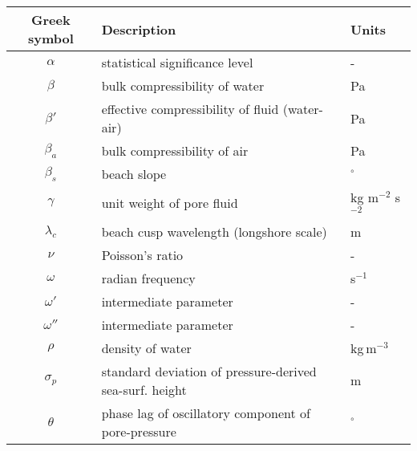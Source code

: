 \setlongtables
\begin{longtable}{cll}
	\hline
	Greek symbol & Description & Units\\
	\hline
	\endhead
	\hline
	\endfoot
	
	$\alpha$ & statistical significance level & -\\	
	$\beta$ & bulk compressibility of water & Pa\\
	$\beta'$ & effective compressibility of fluid (water-air) & Pa\\
	$\beta_a$ & bulk compressibility of air & Pa\\
	$\beta_s$ & beach slope & $^\circ$\\
	$\gamma$ & unit weight of pore fluid & kg m$^{-2}$ s$^{-2}$\\
	$\lambda_c$ & beach cusp wavelength (longshore scale) & m\\
	$\nu$ & Poisson's ratio & -\\
	$\omega$ & radian frequency & s$^{-1}$\\
	$\omega'$ & \citet{Yamamoto_etal1978} intermediate parameter & -\\
	$\omega''$ & \citet{Yamamoto_etal1978} intermediate parameter & -\\
	$\rho$ & density of water & kg\,m$^{-3}$\\
	$\sigma_p$ & standard deviation of pressure-derived sea-surf. height & m\\
	$\theta$ & phase lag of oscillatory component of pore-pressure & $^\circ$\\
	
	\hline
\end{longtable}


